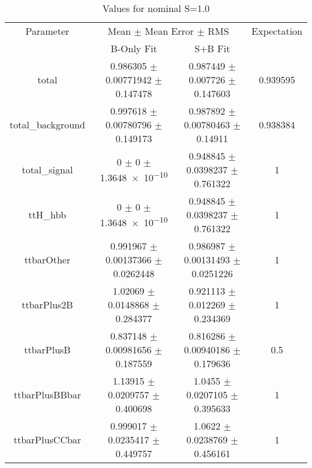 \begin{table}
\centering
\caption{Values for nominal S=1.0}
\begin{tabular}{cccc}
\toprule
Parameter & \multicolumn{2}{c}{Mean $\pm$ Mean Error $\pm$ RMS} & Expectation\\
 & B-Only Fit & S+B Fit & \\
\midrule
total & \num{0.986305} $\pm$ \num{0.00771942} $\pm$ \num{0.147478} & \num{0.987449} $\pm$ \num{0.007726} $\pm$ \num{0.147603} & \num{0.939595}\\
total\_background & \num{0.997618} $\pm$ \num{0.00780796} $\pm$ \num{0.149173} & \num{0.987892} $\pm$ \num{0.00780463} $\pm$ \num{0.14911} & \num{0.938384}\\
total\_signal & \num{0} $\pm$ \num{0} $\pm$ \num{1.3648e-10} & \num{0.948845} $\pm$ \num{0.0398237} $\pm$ \num{0.761322} & \num{1}\\
ttH\_hbb & \num{0} $\pm$ \num{0} $\pm$ \num{1.3648e-10} & \num{0.948845} $\pm$ \num{0.0398237} $\pm$ \num{0.761322} & \num{1}\\
ttbarOther & \num{0.991967} $\pm$ \num{0.00137366} $\pm$ \num{0.0262448} & \num{0.986987} $\pm$ \num{0.00131493} $\pm$ \num{0.0251226} & \num{1}\\
ttbarPlus2B & \num{1.02069} $\pm$ \num{0.0148868} $\pm$ \num{0.284377} & \num{0.921113} $\pm$ \num{0.012269} $\pm$ \num{0.234369} & \num{1}\\
ttbarPlusB & \num{0.837148} $\pm$ \num{0.00981656} $\pm$ \num{0.187559} & \num{0.816286} $\pm$ \num{0.00940186} $\pm$ \num{0.179636} & \num{0.5}\\
ttbarPlusBBbar & \num{1.13915} $\pm$ \num{0.0209757} $\pm$ \num{0.400698} & \num{1.0455} $\pm$ \num{0.0207105} $\pm$ \num{0.395633} & \num{1}\\
ttbarPlusCCbar & \num{0.999017} $\pm$ \num{0.0235417} $\pm$ \num{0.449757} & \num{1.0622} $\pm$ \num{0.0238769} $\pm$ \num{0.456161} & \num{1}\\
\bottomrule
\end{tabular}
\end{table}